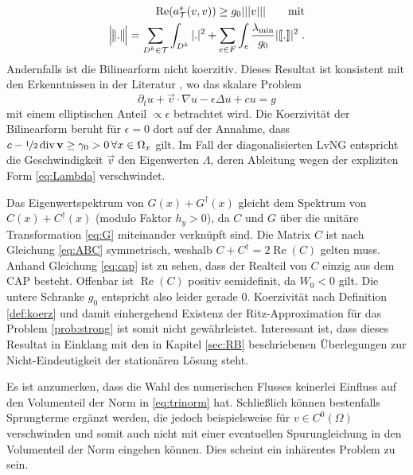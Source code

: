 \begin{align}
  \operatorname{Re}(a\fin^s(v, v)) \geq g_0 |||v||| \qquad \text{mit} \\
  \trinorm{.} = \sum_{D^k\in\mathcal{T}}\int_{D^k} |.|^2 + \sum_{e\in F}\int_e  \frac{\lambda_{\text{min}}}{g_0} |\jump{.}|^2 \; . \label{eq:trinorm}
\end{align}
Andernfalls ist die Bilinearform nicht koerzitiv. Dieses Resultat ist konsistent mit den Erkenntnissen in der Literatur \cite{feistauer2007}, wo das skalare Problem
\begin{equation*}
  \partial_t u + \vec{v}\cdot \nabla u - \epsilon\Delta u + cu = g
\end{equation*}
mit einem elliptischen Anteil $\propto \epsilon$ betrachtet wird. Die Koerzivität der Bilinearform beruht für $\epsilon=0$ dort auf der Annahme, dass ${c-\nicefrac{1}{2}\,\text{div}\,\vec{v}\geq \gamma_0 > 0 \, \forall x\in\Omega_x}$ gilt. Im Fall der diagonalisierten LvNG entspricht die Geschwindigkeit $\vec{v}$ den Eigenwerten $\Lambda$, deren Ableitung wegen der expliziten Form \eqref{eq:Lambda} verschwindet.

Das Eigenwertspektrum von $G(x)+G^{\dagger}(x)$ gleicht dem Spektrum von $C(x)+C^{\dagger}(x)$ (modulo Faktor $h_y>0$), da $C$ und $G$ über die unitäre Transformation \eqref{eq:G} miteinander verknüpft sind. Die Matrix $C$ ist nach Gleichung \eqref{eq:ABC} symmetrisch, weshalb $C+C^{\dagger}=2\operatorname{Re}(C)$ gelten muss. Anhand Gleichung \eqref{eq:cap} ist zu sehen, dass der Realteil von $C$ einzig aus dem CAP besteht.
Offenbar ist $\operatorname{Re}(C)$ positiv semidefinit, da $W_0<0$ gilt. Die untere Schranke $g_0$ entspricht also leider gerade $0$. Koerzivität nach Definition \ref{def:koerz} und damit einhergehend Existenz der Ritz-Approximation für das Problem \ref{prob:strong} ist somit nicht gewährleistet. Interessant ist, dass dieses Resultat in Einklang mit den in Kapitel \ref{sec:RB} beschriebenen Überlegungen zur Nicht-Eindeutigkeit der stationären Lösung steht.

Es ist anzumerken, dass die Wahl des numerischen Flusses keinerlei Einfluss auf den Volumenteil der Norm in \eqref{eq:trinorm} hat. Schließlich können bestenfalls Sprungterme  ergänzt werden, die jedoch beispielsweise für $v\in C^0(\Omega)$ verschwinden und somit auch nicht mit einer eventuellen Spurungleichung in den Volumenteil der Norm eingehen können. Dies scheint ein inhärentes Problem zu sein.


